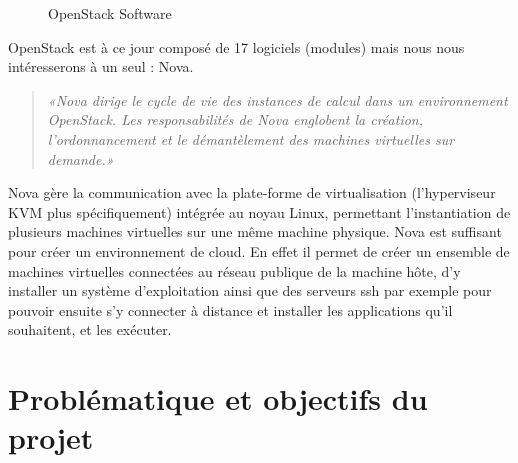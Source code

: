 \documentclass{report}
\begin{document}
        \begin{figure}[H]
            \caption{OpenStack Software \cite{openstack_software}}
        \end{figure}
        
        
        OpenStack est à ce jour composé de 17 logiciels (modules) mais nous nous intéresserons à un seul : Nova.
        \begin{quote}
            \textit{«Nova dirige le cycle de vie des instances de calcul dans un environnement OpenStack. Les responsabilités de Nova englobent la création, l'ordonnancement et le démantèlement des machines virtuelles sur demande.» \cite{openstack_nova}}
        \end{quote}
        \bigbreak
        
        Nova gère la communication avec la plate-forme de virtualisation (l'hyperviseur KVM plus spécifiquement) intégrée au noyau Linux, permettant l'instantiation de plusieurs machines virtuelles sur une même machine physique.
        Nova est suffisant pour créer un environnement de cloud. En effet il permet de créer un ensemble de machines virtuelles connectées au réseau publique de la machine hôte, d'y installer un système d'exploitation ainsi que des serveurs ssh par exemple pour pouvoir ensuite s'y connecter à distance et installer les applications qu'il souhaitent, et les exécuter.

    \section{Problématique et objectifs du projet}
        
\end{document}
